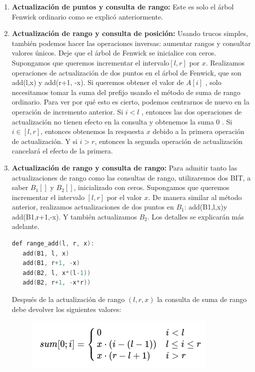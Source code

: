 \begin{enumerate}
	\item \textbf{Actualización de puntos y consulta de rango:} Este es solo el árbol Fenwick ordinario como se explicó anteriormente.
	\item \textbf{Actualización de rango y consulta de posición:} Usando trucos simples, también 
	podemos hacer las operaciones inversas: aumentar rangos y consultar valores únicos. Deje que el 
	árbol de Fenwick se inicialice con ceros. Supongamos que queremos incrementar el intervalo$[l, r]$ por $x$. Realizamos operaciones de actualización de dos puntos en el árbol de Fenwick, que son add(l,x) y add(r+1, -x). Si queremos obtener el valor de $A[i]$ , solo necesitamos tomar la suma del prefijo usando el método de suma de rango ordinario. Para ver por qué esto es cierto, podemos centrarnos de nuevo en la operación de incremento anterior. Si $i<l$ , entonces las dos operaciones de actualización no tienen efecto en la consulta y obtenemos la suma $0$ . Si $i\in[l,r]$, entonces obtenemos la respuesta $x$ debido a la primera operación de actualización. Y si $i>r$, entonces la segunda operación de actualización cancelará el efecto de la primera.
	\item \textbf{Actualización de rango y consulta de rango:} Para admitir tanto las actualizaciones de rango como las consultas de rango, utilizaremos dos BIT, a saber $B_1[]$ y $B_2[]$, inicializado con ceros. Supongamos que queremos incrementar el intervalo $[l,r]$ por el valor $x$. De manera similar al método anterior, realizamos actualizaciones de dos puntos en $B_1$: add(B1,l,x)y add(B1,r+1,-x). Y también actualizamos $B_2$. Los detalles se explicarán más adelante.

\begin{lstlisting}[language=C++]	
def range_add(l, r, x):
   add(B1, l, x)
   add(B1, r+1, -x)
   add(B2, l, x*(l-1))
   add(B2, r+1, -x*r))
\end{lstlisting}	

Después de la actualización de rango $(l, r, x)$ la consulta de suma de rango debe devolver los siguientes valores: 
\begin{figure}[h!]
	\centering
	\includegraphics[width=0.35\linewidth]{img/binary_indexed_tree_1}
	\label{fig:binaryindexedtree1}
\end{figure}


\end{enumerate}
